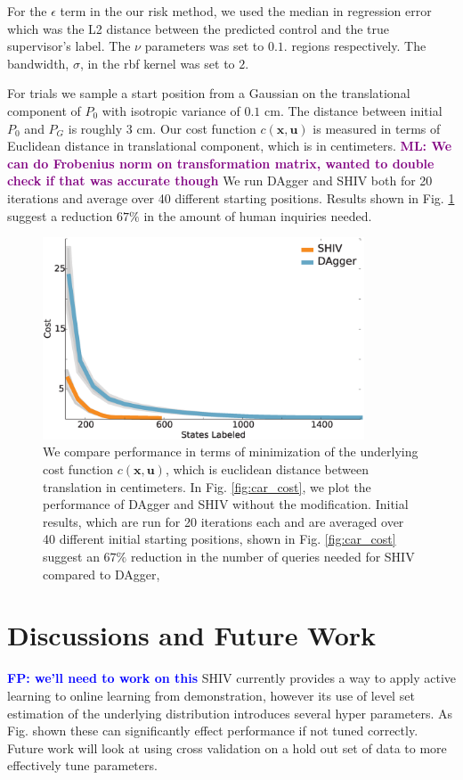 \documentclass[10pt, conference]{ieeeconf}      %
\newcommand{\bu}{\mathbf{u}}
\newcommand{\bx}{\mathbf{x}}
\newcommand{\fpnote}[1]{\ifthenelse{\boolean{include-notes}}%
 {\textcolor{blue}{\textbf{FP: #1}}}{}}
\newcommand{\mlnote}[1]{\ifthenelse{\boolean{include-notes}}%
 {\textcolor{purple}{\textbf{ML: #1}}}{}}
\begin{document}
For the $\epsilon$ term in the our risk method, we used the median in regression error which was the L2 distance between the predicted control and the true supervisor's label. The  $\nu$ parameters was set to $0.1$.
regions respectively. The bandwidth, $\sigma$, in the rbf kernel was set to $2$.

For trials we sample a start position from a Gaussian on the translational component of $P_0$ with isotropic variance of
$0.1$ cm. The distance between initial $P_0$ and $P_G$ is roughly $3$ cm. Our cost function $c(\bx,\bu)$ is measured in
terms of Euclidean distance in translational component, which is in centimeters. \mlnote{We can do Frobenius norm on transformation matrix, wanted to double check if that was accurate though} We run DAgger and SHIV both for 20 iterations and average over 40 different starting positions.
Results shown in Fig. \ref{fig:needle} suggest a reduction $67\%$ in the amount of human inquiries needed. 





\begin{figure}[t!]
\centering
\includegraphics[width=\columnwidth, height=6cm]{figures/needle_insertion_results.eps}
\caption{We compare performance in terms of minimization of the underlying cost function $c(\bx,\bu)$, which is euclidean distance between translation in centimeters. In Fig. \ref{fig:car_cost}, we plot the performance of DAgger and SHIV without the modification.  Initial results, which are run for 20 iterations each and are averaged over 40 different initial starting positions, shown in Fig. \ref{fig:car_cost} suggest an $67\%$ reduction in the number of queries needed for SHIV compared to DAgger,}
\vspace*{-10pt}
\label{fig:needle}
\end{figure}



\section{Discussions and Future Work}
\fpnote{we'll need to work on this}
SHIV currently provides a way to apply active learning to online learning from demonstration, however its use of level set estimation of the underlying distribution introduces several hyper parameters. As Fig. shown these can significantly effect performance if not tuned correctly. Future work will look at using cross validation on a hold out set of data to more effectively tune parameters. 
\end{document}
